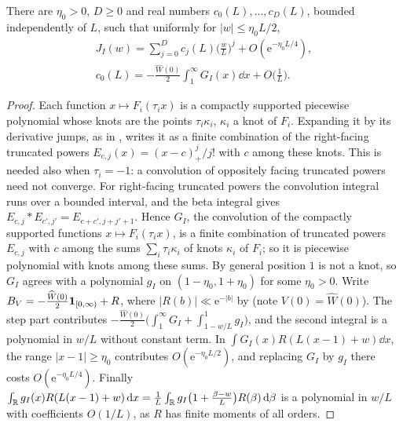 \documentclass[11pt,colorlinks]{charlie}
\newcommand{\e}{\mathrm{e}}
\begin{document}
\begin{lemma}\label{lem:transition}
There are $\eta_0>0$, $D\ge0$ and real numbers $c_0(L),\dots,c_D(L)$, bounded independently of $L$, such that uniformly for $|w|\le\eta_0L/2$,
\begin{gather*}
 J_I(w)=\sum_{j=0}^Dc_j(L)\Big(\frac wL\Big)^j+O(\e^{-\eta_0L/4}),\\
 c_0(L)=-\frac{\widehat W(0)}2\int_1^\infty G_I(x)\dd x+O\Big(\frac1L\Big).
\end{gather*}
\end{lemma}
\begin{proof}
Each function $x\mapsto F_i(\tau_ix)$ is a compactly supported piecewise polynomial whose knots are the points $\tau_i\kappa_i$, $\kappa_i$ a knot of $F_i$. Expanding it by its derivative jumps, as in , writes it as a finite combination of the right-facing truncated powers $E_{c,j}(x)=(x-c)_+^j/j!$ with $c$ among these knots. This is needed also when $\tau_i=-1$: a convolution of oppositely facing truncated powers need not converge. For right-facing truncated powers the convolution integral runs over a bounded interval, and the beta integral gives $E_{c,j}*E_{c',j'}=E_{c+c',j+j'+1}$. Hence $G_I$, the convolution of the compactly supported functions $x\mapsto F_i(\tau_ix)$, is a finite combination of truncated powers $E_{c,j}$ with $c$ among the sums $\sum_i\tau_i\kappa_i$ of knots $\kappa_i$ of $F_i$; so it is piecewise polynomial with knots among these sums. By general position $1$ is not a knot, so $G_I$ agrees with a polynomial $g_I$ on $(1-\eta_0,1+\eta_0)$ for some $\eta_0>0$. Write $B_V=-\frac{\widehat W(0)}2\mathbf{1}_{[0,\infty)}+R$, where $|R(b)|\ll\e^{-|b|}$ by  (note $V(0)=\widehat W(0)$). The step part contributes $-\frac{\widehat W(0)}2\big(\int_1^\infty G_I+\int_{1-w/L}^1g_I\big)$, and the second integral is a polynomial in $w/L$ without constant term. In $\int G_I(x)R(L(x-1)+w)\dd x$, the range $|x-1|\ge\eta_0$ contributes $O(\e^{-\eta_0L/2})$, and replacing $G_I$ by $g_I$ there costs $O(\e^{-\eta_0L/4})$. Finally $\int_{\mathbb{R}} g_I(x)R(L(x-1)+w)\,\mathrm{d} x=\frac1L\int_{\mathbb{R}} g_I\big(1+\frac{\beta-w}L\big)R(\beta)\,\mathrm{d}\beta$ is a polynomial in $w/L$ with coefficients $O(1/L)$, as $R$ has finite moments of all orders.
\end{proof}
\end{document}
